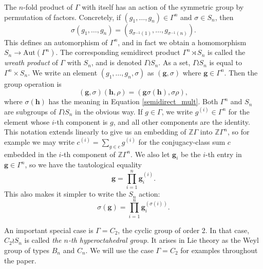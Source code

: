 \documentclass[ALCO,Unicode]{cedram}
\begin{document}
The $n$-fold product of $\Gamma$ with itself has an action of the symmetric group by permutation of factors. Concretely, if $(g_1, \ldots, g_n) \in \Gamma^n$ and $\sigma \in S_n$, then
\begin{equation} \label{semidirect_mult}
\sigma (g_1, \ldots, g_n) = (g_{\sigma^{-1}(1)}, \ldots, g_{\sigma^{-1}(n)}).
\end{equation}
This defines an automorphism of $\Gamma^n$, and in fact we obtain a homomorphism $S_n \to \mathrm{Aut}(\Gamma^n)$. The corresponding semidirect product $\Gamma^n \rtimes S_n$ is called the \emph{wreath product} of $\Gamma$ with $S_n$, and is denoted $\Gamma \wr S_n$. As a set, $\Gamma \wr S_n$ is equal to $\Gamma^n \times S_n$. We write an element $(g_1, \ldots, g_n, \sigma)$ as $(\mathbf{g}, \sigma)$ where $\mathbf{g} \in \Gamma^n$. Then the group operation is
\[
(\mathbf{g}, \sigma) (\mathbf{h}, \rho) = (\mathbf{g} \sigma(\mathbf{h}), \sigma \rho),
\]
where $\sigma(\mathbf{h})$ has the meaning in Equation \eqref{semidirect_mult}. Both $\Gamma^n$ and $S_n$ are subgroups of $\Gamma \wr S_n$ in the obvious way. If $g \in \Gamma$, we write $g^{(i)} \in \Gamma^n$ for the element whose $i$-th component is $g$, and all other components are the identity. This notation extends linearly to give us an embedding of $\mathbb{Z}\Gamma$ into $\mathbb{Z}\Gamma^n$, so for example we may write $c^{(i)} = \sum_{g \in c} g^{(i)}$ for the conjugacy-class sum $c$ embedded in the $i$-th component of $\mathbb{Z}\Gamma^n$. We also let $\mathbf{g}_i$ be the $i$-th entry in $\mathbf{g} \in \Gamma^n$, so we have the tautological equality
\[
\mathbf{g} = \prod_{i=1}^n \mathbf{g}_i^{(i)}.
\]
This also makes it simpler to write the $S_n$ action:
\[
\sigma(\mathbf{g}) = \prod_{i=1}^n \mathbf{g}_{i}^{(\sigma(i))}.
\]
\begin{example}
An important special case is $\Gamma = C_2$, the cyclic group of order 2. In that case, $C_2 \wr S_n$ is called \emph{the $n$-th hyperoctahedral group}. It arises in Lie theory as the Weyl group of types $B_n$ and $C_n$. We will use the case $\Gamma = C_2$ for examples throughout the paper.
\end{example}
\end{document}
